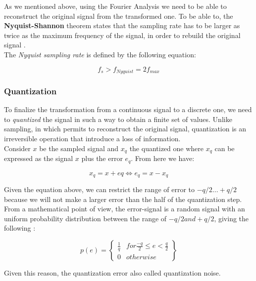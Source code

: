 \noindent As we mentioned above, using the Fourier Analysis we need to be able to reconstruct the original signal from the transformed one. To be able to, the \textbf{Nyquist-Shannon} theorem states that the sampling rate has to be larger as twice as the maximum frequency of the signal, in order to rebuild the original signal \cite{sampling_illinois}.\\
\noindent The \textit{Nyquist sampling rate} is defined by the following equation:

\begin{equation}
f_{s} > f_{Nyquist} = 2f_{max}
\end{equation}


\subsubsection{Quantization}
\label{subs:quantization}
To finalize the transformation from a continuous signal to a discrete one, we need to \textit{quantized} the signal in such a way to obtain a finite set of values. Unlike sampling, in which permits to reconstruct the original signal, quantization is an irreversible operation that introduce a loss of information. \\
\noindent Consider $x$ be the sampled signal and $x_{q}$ the quantized one where $x_{q}$ can be expressed as the signal $x$ plus the error $e_{q}$. From here we have:

\begin{equation}
x_{q} = x + e{q} \Leftrightarrow e_{q} = x - x_{q}
\end{equation}

Given the equation above, we can restrict the range of error to $-q/2 ... +q/2$ because we will not make a larger error than the half of the quantization step. From a mathematical point of view, the error-signal is a random signal with an uniform probability distribution between the range of $−q/2 and +q/2$, giving the following \cite{quantization_math}:

\begin{equation}
p(e) = \begin{Bmatrix}
			\frac{1}{q} & for \frac{-q}{2} \leq  e < \frac{q}{2}\\
			0 			& otherwise
		\end{Bmatrix}
\end{equation}

Given this reason, the quantization error also called quantization noise.

